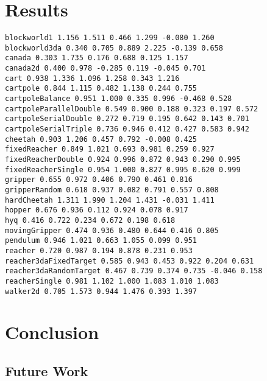 \documentclass{article} %
\numberwithin{equation}{subsection}
\numberwithin{theorem}{subsection}
\begin{document}
\section{Results}
\begin{verbatim}
blockworld1 1.156 1.511 0.466 1.299 -0.080 1.260
blockworld3da 0.340 0.705 0.889 2.225 -0.139 0.658
canada 0.303 1.735 0.176 0.688 0.125 1.157
canada2d 0.400 0.978 -0.285 0.119 -0.045 0.701
cart 0.938 1.336 1.096 1.258 0.343 1.216
cartpole 0.844 1.115 0.482 1.138 0.244 0.755
cartpoleBalance 0.951 1.000 0.335 0.996 -0.468 0.528
cartpoleParallelDouble 0.549 0.900 0.188 0.323 0.197 0.572
cartpoleSerialDouble 0.272 0.719 0.195 0.642 0.143 0.701
cartpoleSerialTriple 0.736 0.946 0.412 0.427 0.583 0.942
cheetah 0.903 1.206 0.457 0.792 -0.008 0.425
fixedReacher 0.849 1.021 0.693 0.981 0.259 0.927
fixedReacherDouble 0.924 0.996 0.872 0.943 0.290 0.995
fixedReacherSingle 0.954 1.000 0.827 0.995 0.620 0.999
gripper 0.655 0.972 0.406 0.790 0.461 0.816
gripperRandom 0.618 0.937 0.082 0.791 0.557 0.808
hardCheetah 1.311 1.990 1.204 1.431 -0.031 1.411
hopper 0.676 0.936 0.112 0.924 0.078 0.917
hyq 0.416 0.722 0.234 0.672 0.198 0.618
movingGripper 0.474 0.936 0.480 0.644 0.416 0.805
pendulum 0.946 1.021 0.663 1.055 0.099 0.951
reacher 0.720 0.987 0.194 0.878 0.231 0.953
reacher3daFixedTarget 0.585 0.943 0.453 0.922 0.204 0.631
reacher3daRandomTarget 0.467 0.739 0.374 0.735 -0.046 0.158
reacherSingle 0.981 1.102 1.000 1.083 1.010 1.083
walker2d 0.705 1.573 0.944 1.476 0.393 1.397
\end{verbatim}



\section{Conclusion}
\subsection{Future Work}



%
\end{document}
